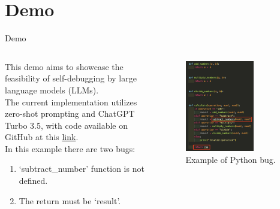 \section{Demo}

\begin{frame}{Demo}
    \begin{columns}[T]
        \begin{column}{0.5\textwidth}
            This demo aims to showcase the feasibility of self-debugging by large language models (LLMs).\\
            The current implementation utilizes zero-shot prompting and ChatGPT Turbo 3.5, with code available on GitHub at this \href{https://github.com/tqtensor/wolverine}{link}.\\
            \vspace{0.5cm}
            In this example there are two bugs:
            \begin{enumerate}
                \item `subtract\_number' function is not defined.

                \item The return must be `result'.
            \end{enumerate}
        \end{column}
        \begin{column}{0.5\textwidth}
            \begin{figure}[!htb]
                \centering
                \includegraphics[width=0.7\textwidth]{img/demo}
                \captionsetup{font=small,labelformat=empty}
                \caption{Example of Python bug.}
            \end{figure}
        \end{column}
    \end{columns}
\end{frame}
